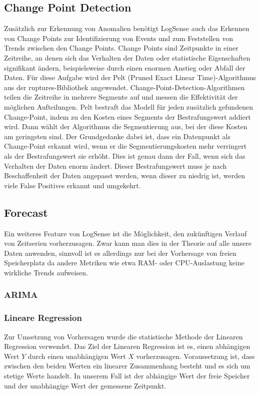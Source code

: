 \documentclass{report}
\begin{document}
\subsection{Change Point Detection}
Zusätzlich zur Erkennung von Anomalien benötigt LogSense auch das Erkennen von Change Points zur Identifizierung von Events und zum Feststellen von Trends zwischen den Change Points. Change Points sind Zeitpunkte in einer Zeitreihe, an denen sich das Verhalten der Daten oder statistische Eigenschaften signifikant ändern, beispielsweise durch einen enormen Anstieg oder Abfall der Daten. Für diese Aufgabe wird der Pelt (Pruned Exact Linear Time)-Algorithmus aus der ruptures-Bibliothek angewendet. Change-Point-Detection-Algorithmen teilen die Zeitreihe in mehrere Segmente auf und messen die Effektivität der möglichen Aufteilungen. Pelt bestraft das Modell für jeden zusätzlich gefundenen Change-Point, indem zu den Kosten eines Segments der Bestrafungswert addiert wird. Dann wählt der Algorithmus die Segmentierung aus, bei der diese Kosten am geringsten sind. Der Grundgedanke dabei ist, dass ein Datenpunkt als Change-Point erkannt wird, wenn er die Segmentierungskosten mehr verringert als der Bestrafungswert sie erhöht. Dies ist genau dann der Fall, wenn sich das Verhalten der Daten enorm ändert. Dieser Bestrafungswert muss je nach Beschaffenheit der Daten angepasst werden, wenn dieser zu niedrig ist, werden viele False Positives erkannt und umgekehrt.
\citet{change_point_explanation}
\subsection{Forecast}
Ein weiteres Feature von LogSense ist die Möglichkeit, den zukünftigen Verlauf von Zeitserien vorherzusagen. Zwar kann man dies in der Theorie auf alle unsere Daten anwenden, sinnvoll ist es allerdings nur bei der Vorhersage von freien Speicherplatz da andere Metriken wie etwa RAM- oder CPU-Auslastung keine wirkliche Trends aufweisen. 
\subsubsection{ARIMA}
\subsubsection{Lineare Regression}

Zur Umsetzung von Vorhersagen wurde die statistische Methode der Linearen Regression verwendet. Das Ziel der Linearen Regression ist es, einen abhängigen Wert \( Y \) durch einen unabhängigen Wert \( X \) vorherzusagen. Voraussetzung ist, dass zwischen den beiden Werten ein linearer Zusammenhang besteht und es sich um stetige Werte handelt. In unserem Fall ist der abhängige Wert der freie Speicher und der unabhängige Wert der gemessene Zeitpunkt.\newline
\end{document}
